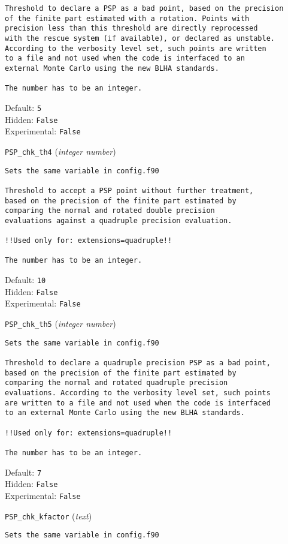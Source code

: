 \begin{basedescript}{\desclabelstyle{\pushlabel}}
\begin{verbatim}
Threshold to declare a PSP as a bad point, based on the precision
of the finite part estimated with a rotation. Points with
precision less than this threshold are directly reprocessed
with the rescue system (if available), or declared as unstable.
According to the verbosity level set, such points are written
to a file and not used when the code is interfaced to an
external Monte Carlo using the new BLHA standards.

The number has to be an integer.
\end{verbatim}
Default: \verb|5|
\\Hidden: \verb|False|
\\Experimental: \verb|False|
\\\item[\colorbox{gray!30}{\texttt{PSP\_chk\_th4}}] (\textit{integer number})
\begin{verbatim}
Sets the same variable in config.f90

Threshold to accept a PSP point without further treatment,
based on the precision of the finite part estimated by
comparing the normal and rotated double precision
evaluations against a quadruple precision evaluation.

!!Used only for: extensions=quadruple!!

The number has to be an integer.
\end{verbatim}
Default: \verb|10|
\\Hidden: \verb|False|
\\Experimental: \verb|False|
\\\item[\colorbox{gray!30}{\texttt{PSP\_chk\_th5}}] (\textit{integer number})
\begin{verbatim}
Sets the same variable in config.f90

Threshold to declare a quadruple precision PSP as a bad point,
based on the precision of the finite part estimated by
comparing the normal and rotated quadruple precision
evaluations. According to the verbosity level set, such points
are written to a file and not used when the code is interfaced
to an external Monte Carlo using the new BLHA standards.

!!Used only for: extensions=quadruple!!

The number has to be an integer.
\end{verbatim}
Default: \verb|7|
\\Hidden: \verb|False|
\\Experimental: \verb|False|
\\\item[\colorbox{gray!30}{\texttt{PSP\_chk\_kfactor}}] (\textit{text})
\begin{verbatim}
Sets the same variable in config.f90


\end{verbatim}
\end{basedescript}
